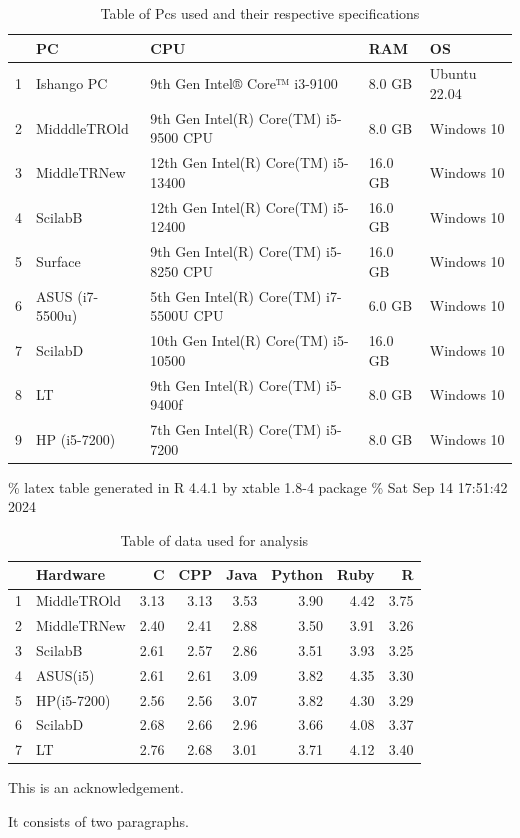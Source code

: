 \documentclass[12pt,halfline,a4paper,]{ouparticle}
\begin{document}
\begin{table}[ht]
\centering
\begin{tabular}{rllll}
  \hline
 & PC & CPU & RAM & OS \\ 
  \hline
1 & Ishango PC &  9th Gen Intel® Core™ i3-9100  &  8.0 GB  & Ubuntu 22.04 \\ 
  2 & MidddleTROld &  9th Gen Intel(R) Core(TM) i5-9500 CPU  &  8.0 GB  &   Windows 10 \\ 
  3 & MiddleTRNew  &  12th Gen Intel(R) Core(TM) i5-13400  &  16.0 GB  &   Windows 10 \\ 
  4 & ScilabB  &   12th Gen Intel(R) Core(TM) i5-12400  &   16.0 GB   &   Windows 10 \\ 
  5 & Surface  &   9th Gen Intel(R) Core(TM) i5-8250 CPU  &   16.0 GB   &   Windows 10 \\ 
  6 & ASUS (i7-5500u)  &   5th Gen Intel(R) Core(TM) i7-5500U CPU  &   6.0 GB   &   Windows 10 \\ 
  7 & ScilabD  &   10th Gen Intel(R) Core(TM) i5-10500  &   16.0 GB   &   Windows 10 \\ 
  8 & LT  &   9th Gen Intel(R) Core(TM) i5-9400f  &   8.0 GB   &   Windows 10 \\ 
  9 & HP (i5-7200)  &   7th Gen Intel(R) Core(TM) i5-7200  &   8.0 GB   &   Windows 10 \\ 
   \hline
\end{tabular}
\caption{Table of Pcs used and their respective specifications} 
\end{table}

\% latex table generated in R 4.4.1 by xtable 1.8-4 package \% Sat Sep
14 17:51:42 2024

\begin{table}[ht]
\centering
\begin{tabular}{rlrrrrrr}
  \hline
 & Hardware & C & CPP & Java & Python & Ruby & R \\ 
  \hline
1 & MiddleTROld & 3.13 & 3.13 & 3.53 & 3.90 & 4.42 & 3.75 \\ 
  2 & MiddleTRNew & 2.40 & 2.41 & 2.88 & 3.50 & 3.91 & 3.26 \\ 
  3 & ScilabB & 2.61 & 2.57 & 2.86 & 3.51 & 3.93 & 3.25 \\ 
  4 & ASUS(i5) & 2.61 & 2.61 & 3.09 & 3.82 & 4.35 & 3.30 \\ 
  5 & HP(i5-7200) & 2.56 & 2.56 & 3.07 & 3.82 & 4.30 & 3.29 \\ 
  6 & ScilabD & 2.68 & 2.66 & 2.96 & 3.66 & 4.08 & 3.37 \\ 
  7 & LT & 2.76 & 2.68 & 3.01 & 3.71 & 4.12 & 3.40 \\ 
   \hline
\end{tabular}
\caption{Table of data used for analysis} 
\end{table}


\begin{notes}[Acknowledgements]
This is an acknowledgement.

It consists of two paragraphs.
\end{notes}
\end{document}
